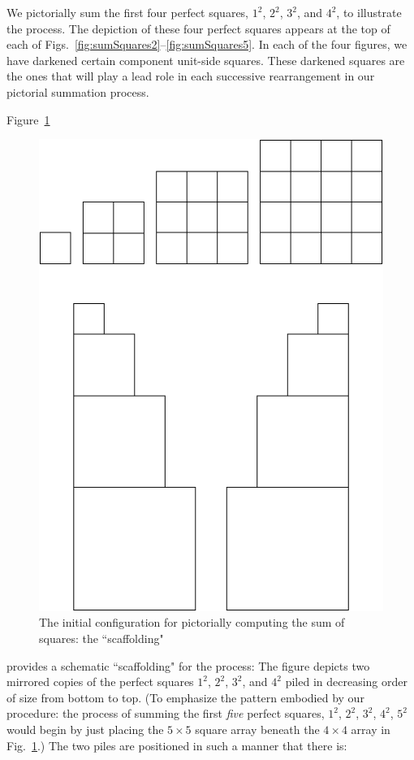 \smallskip

We pictorially sum the first four perfect squares, $1^2$, $2^2$, $3^2$, and $4^2$, to illustrate the process.  The depiction of these four perfect squares appears at the top of each of Figs.~\ref{fig:sumSquares2}--\ref{fig:sumSquares5}.  In each of the four figures, we have darkened certain component unit-side squares.  These darkened squares are the ones that will play a lead role in each successive rearrangement in our pictorial summation process.

\medskip

Figure~\ref{fig:sumSquares1} 
\begin{figure}[htb]
\begin{center}
       \includegraphics[scale=0.3]{FiguresMaths/SumSquares1}
\caption{The initial configuration for pictorially computing the sum of squares: the ``scaffolding"}
       \label{fig:sumSquares1}
\end{center}
\end{figure}
provides a schematic ``scaffolding" for the process:  The figure depicts two mirrored copies of the perfect squares $1^2$, $2^2$, $3^2$, and $4^2$ piled in decreasing order of size from bottom to top.  (To emphasize the pattern embodied by our procedure: the process of summing the first {\em five} perfect squares, $1^2$, $2^2$, $3^2$, $4^2$, $5^2$ would begin by just placing the $5 \times 5$ square array beneath the $4 \times 4$ array in Fig.~\ref{fig:sumSquares1}.)  The two piles are positioned in such a manner that there is:
